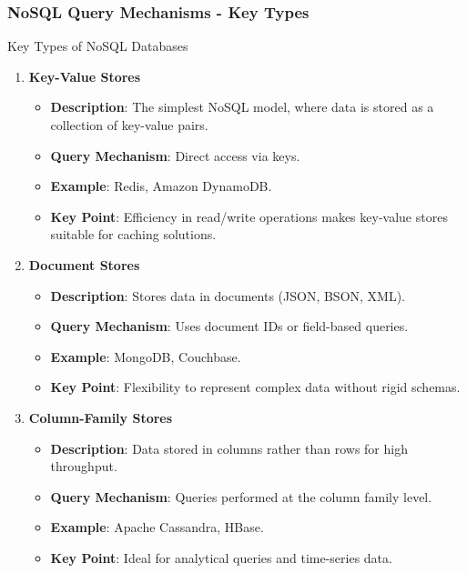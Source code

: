 \documentclass[aspectratio=169]{beamer}
\begin{document}
\begin{frame}[fragile]
    \frametitle{NoSQL Query Mechanisms - Key Types}
    \begin{block}{Key Types of NoSQL Databases}
        \begin{enumerate}
            \item \textbf{Key-Value Stores}
            \begin{itemize}
                \item \textbf{Description}: The simplest NoSQL model, where data is stored as a collection of key-value pairs.
                \item \textbf{Query Mechanism}: Direct access via keys.
                \item \textbf{Example}: Redis, Amazon DynamoDB.
                \item \textbf{Key Point}: Efficiency in read/write operations makes key-value stores suitable for caching solutions.
            \end{itemize}
            
            \item \textbf{Document Stores}
            \begin{itemize}
                \item \textbf{Description}: Stores data in documents (JSON, BSON, XML).
                \item \textbf{Query Mechanism}: Uses document IDs or field-based queries.
                \item \textbf{Example}: MongoDB, Couchbase.
                \item \textbf{Key Point}: Flexibility to represent complex data without rigid schemas.
            \end{itemize}
            
            \item \textbf{Column-Family Stores}
            \begin{itemize}
                \item \textbf{Description}: Data stored in columns rather than rows for high throughput.
                \item \textbf{Query Mechanism}: Queries performed at the column family level.
                \item \textbf{Example}: Apache Cassandra, HBase.
                \item \textbf{Key Point}: Ideal for analytical queries and time-series data.
            \end{itemize}
        \end{enumerate}
    \end{block}
\end{frame}
\end{document}
